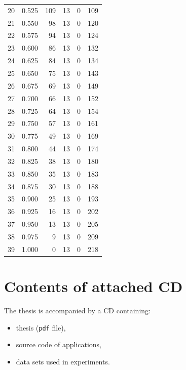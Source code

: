 \documentclass[a4paper,twoside,12pt]{book}
\begin{document}
\begin{appendices}
\begin{table}
\begin{tabular}{lrrrrr}
		20 &  0.525 &       109 &        13 &               0 &             109 \\
		21 &  0.550 &        98 &        13 &               0 &             120 \\
		22 &  0.575 &        94 &        13 &               0 &             124 \\
		23 &  0.600 &        86 &        13 &               0 &             132 \\
		24 &  0.625 &        84 &        13 &               0 &             134 \\
		25 &  0.650 &        75 &        13 &               0 &             143 \\
		26 &  0.675 &        69 &        13 &               0 &             149 \\
		27 &  0.700 &        66 &        13 &               0 &             152 \\
		28 &  0.725 &        64 &        13 &               0 &             154 \\
		29 &  0.750 &        57 &        13 &               0 &             161 \\
		30 &  0.775 &        49 &        13 &               0 &             169 \\
		31 &  0.800 &        44 &        13 &               0 &             174 \\
		32 &  0.825 &        38 &        13 &               0 &             180 \\
		33 &  0.850 &        35 &        13 &               0 &             183 \\
		34 &  0.875 &        30 &        13 &               0 &             188 \\
		35 &  0.900 &        25 &        13 &               0 &             193 \\
		36 &  0.925 &        16 &        13 &               0 &             202 \\
		37 &  0.950 &        13 &        13 &               0 &             205 \\
		38 &  0.975 &         9 &        13 &               0 &             209 \\
		39 &  1.000 &         0 &        13 &               0 &             218 \\
		\bottomrule
	\end{tabular}
\end{table} 

 

\chapter*{Contents of attached CD}

The thesis is accompanied by a CD containing:
\begin{itemize}
\item thesis (\texttt{pdf} file),
\item source code of applications,
\item data sets used in experiments.
\end{itemize}

\listoffigures
\listoftables
	
\end{appendices}
\end{document}
